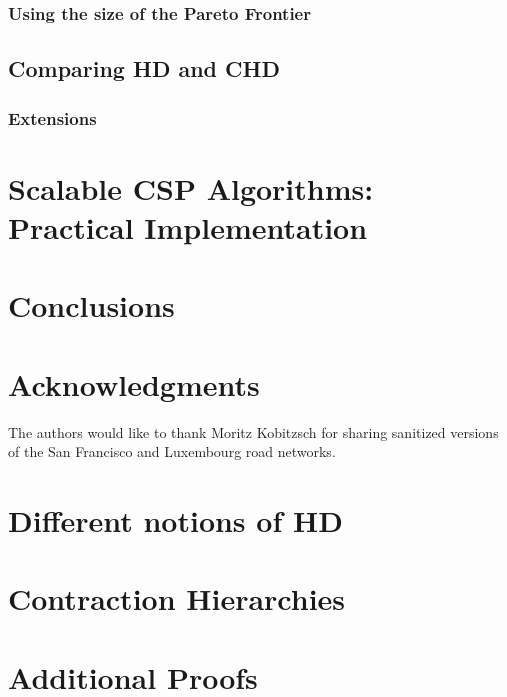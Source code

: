 \documentclass{vldb}
\begin{document}
\subsubsection{Using the size of the Pareto Frontier}


\subsection{Comparing HD and CHD}
\label{ssec:hdvschd}


\subsubsection{Extensions}


\section{Scalable CSP Algorithms: \texorpdfstring{\\}{ } Practical Implementation}
\label{sec:numeric}


\section{Conclusions}


\balance

\section{Acknowledgments}

The authors would like to thank Moritz Kobitzsch for sharing sanitized versions of the San Francisco and Luxembourg road networks.


 


\begin{appendix}

\section{Different notions of HD}
\label{app:generalhd}


\section{Contraction Hierarchies}


\section{Additional Proofs}
\label{sec:proofs}




\end{appendix}
\end{document}
